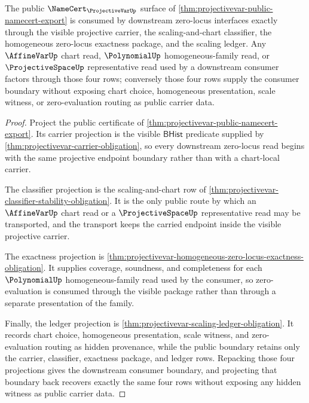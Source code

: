 \begin{theorem}
\label{thm:projectivevar-public-zero-locus-downstream-bridge}
The public $\NameCert_{\ProjectiveVarUp}$ surface of \autoref{thm:projectivevar-public-namecert-export} is consumed by downstream zero-locus interfaces exactly through the visible projective carrier, the scaling-and-chart classifier, the homogeneous zero-locus exactness package, and the scaling ledger. Any $\AffineVarUp$ chart read, $\PolynomialUp$ homogeneous-family read, or $\ProjectiveSpaceUp$ representative read used by a downstream consumer factors through those four rows; conversely those four rows supply the consumer boundary without exposing chart choice, homogeneous presentation, scale witness, or zero-evaluation routing as public carrier data.
\end{theorem}
\begin{proof}
Project the public certificate of \autoref{thm:projectivevar-public-namecert-export}. Its carrier projection is the visible $\mathsf{BHist}$ predicate supplied by \autoref{thm:projectivevar-carrier-obligation}, so every downstream zero-locus read begins with the same projective endpoint boundary rather than with a chart-local carrier.

The classifier projection is the scaling-and-chart row of \autoref{thm:projectivevar-classifier-stability-obligation}. It is the only public route by which an $\AffineVarUp$ chart read or a $\ProjectiveSpaceUp$ representative read may be transported, and the transport keeps the carried endpoint inside the visible projective carrier.

The exactness projection is \autoref{thm:projectivevar-homogeneous-zero-locus-exactness-obligation}. It supplies coverage, soundness, and completeness for each $\PolynomialUp$ homogeneous-family read used by the consumer, so zero-evaluation is consumed through the visible package rather than through a separate presentation of the family.

Finally, the ledger projection is \autoref{thm:projectivevar-scaling-ledger-obligation}. It records chart choice, homogeneous presentation, scale witness, and zero-evaluation routing as hidden provenance, while the public boundary retains only the carrier, classifier, exactness package, and ledger rows. Repacking those four projections gives the downstream consumer boundary, and projecting that boundary back recovers exactly the same four rows without exposing any hidden witness as public carrier data.
\end{proof}


